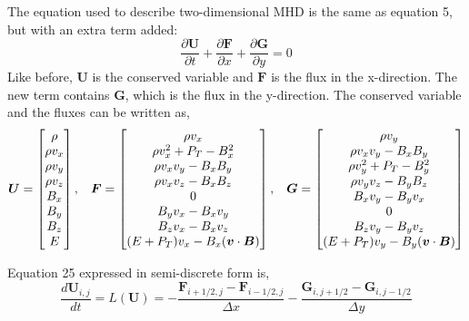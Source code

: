 \documentclass{article}
\begin{document}
The equation used to describe two-dimensional MHD is the same as equation 5, but with an extra term added:
\begin{equation}
    \frac{\partial \boldsymbol{U}}{\partial t} + \frac{\partial \boldsymbol{F}}{\partial x} + \frac{\partial \boldsymbol{G}}{\partial y} = 0
\end{equation}
Like before, $\boldsymbol{U}$ is the conserved variable and $\boldsymbol{F}$ is the flux in the x-direction. The new term contains $\boldsymbol{G}$, which is the flux in the y-direction. The conserved variable and the fluxes can be written as, 
\begin{equation}
    \boldsymbol{U} = \begin{bmatrix} \rho \\ \rho v_x \\ \rho v_y \\
    \rho v_z \\ B_x \\ B_y \\ B_z \\ E\end{bmatrix},   \hspace{3mm}
    \boldsymbol{F}  = \begin{bmatrix} \rho v_x \\ \rho v_x^2 + P_T - B_x^2 \\ \rho v_x v_y -B_xB_y \\ \rho v_x v_z-B_xB_z \\ 0 \\ B_yv_x - B_xv_y \\ B_zv_x - B_xv_z \\ (E+P_T)v_x -B_x(\boldsymbol{v} \cdot \boldsymbol{B})\end{bmatrix},
    \hspace{3mm}
    \boldsymbol{G} = \begin{bmatrix}
        \rho v_y \\ \rho v_x v_y - B_x B_y \\ \rho v_y^2 + P_T - B_y^2 \\ \rho v_y v_z - B_y B_z \\ B_x v_y - B_y v_x \\ 0 \\ B_z v_y - B_y v_z \\ (E+P_T) v_y - B_y (\boldsymbol{v} \cdot \boldsymbol{B})
    \end{bmatrix}
\end{equation} 

Equation 25 expressed in semi-discrete form is, 
\begin{equation}
    \frac{d\boldsymbol{U}_{i,j}}{dt} = L(\boldsymbol{U}) = - \frac{\boldsymbol{F}_{i+1/2,j} - \boldsymbol{F}_{i-1/2,j}}{\Delta x} - \frac{\boldsymbol{G}_{i,j+1/2} - \boldsymbol{G}_{i,j-1/2}}{\Delta y}
\end{equation}
\end{document}

